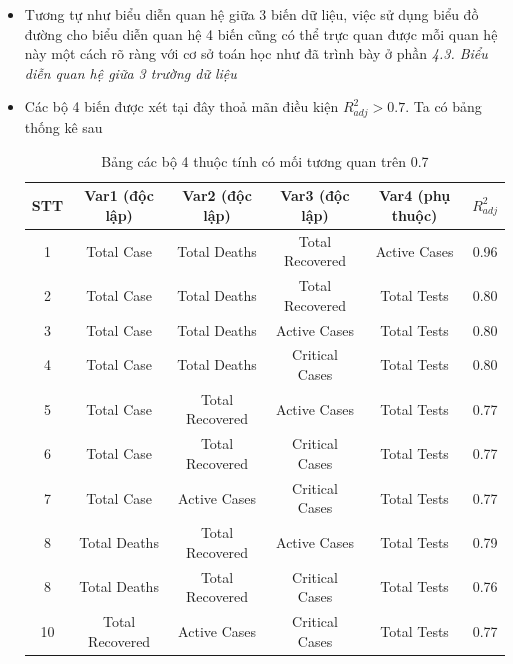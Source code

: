 \documentclass[a4paper, 12pt]{article}
\begin{document}
    \begin{itemize}
        \item Tương tự như biểu diễn quan hệ giữa 3 biến dữ liệu, việc sử dụng biểu đồ đường cho biểu diễn quan hệ 4 biến cũng có thể trực quan được mỗi quan hệ này một cách rõ ràng với cơ sở toán học như đã trình bày ở phần \textit{4.3. Biểu diễn quan hệ giữa 3 trường dữ liệu}
        \item Các bộ 4 biến được xét tại đây thoả mãn điều kiện $R_{adj}^2 > 0.7$. Ta có bảng thống kê sau
        \begin{table}[H]
            \centering
            \begin{tabular}{|c|c|c|c|c|c|} 
            \hline
            \textbf{ STT } & \textbf{ Var1 (độc lập) } & \textbf{ Var2 (độc lập) } & \textbf{ Var3 (độc lập) } & \textbf{ Var4 (phụ thuộc) } & \textbf{ $R_{adj}^2$ }  \\ \hline
            1              & Total Case                & Total Deaths              & Total Recovered           & Active Cases                & 0.96                \\ \hline
            2              & Total Case                & Total Deaths              & Total Recovered           & Total Tests                 & 0.80                \\ \hline
            3              & Total Case                & Total Deaths              & Active Cases              & Total Tests                 & 0.80                \\ \hline
            4              & Total Case                & Total Deaths              & Critical Cases            & Total Tests                 & 0.80                \\ \hline
            5              & Total Case                & Total Recovered           & Active Cases              & Total Tests                 & 0.77                \\ \hline
            6              & Total Case                & Total Recovered           & Critical Cases            & Total Tests                 & 0.77                \\ \hline
            7              & Total Case                & Active Cases              & Critical Cases            & Total Tests                 & 0.77                \\ \hline
            8              & Total Deaths              & Total Recovered           & Active Cases              & Total Tests                 & 0.79                \\ \hline
            8              & Total Deaths              & Total Recovered           & Critical Cases            & Total Tests                 & 0.76                \\ \hline
            10             & Total Recovered           & Active Cases              & Critical Cases            & Total Tests                 & 0.77                \\\hline
            \end{tabular}
            \caption{Bảng các bộ 4 thuộc tính có mối tương quan trên 0.7}
        \end{table}


\end{itemize}
\end{document}
